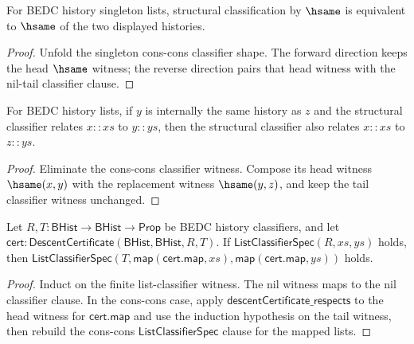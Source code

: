 \begin{theorem}
\label{thm:list-classifier-hsame-singleton-iff}
For BEDC history singleton lists, structural classification by \(\hsame\) is
equivalent to \(\hsame\) of the two displayed histories.
\end{theorem}
\begin{proof}
Unfold the singleton cons-cons classifier shape. The forward direction keeps
the head \(\hsame\) witness; the reverse direction pairs that head witness with
the nil-tail classifier clause.
\end{proof}

\begin{theorem}
\label{thm:list-classifier-hsame-cons-head-transport}
For BEDC history lists, if \(y\) is internally the same history as \(z\) and
the structural classifier relates \(x::xs\) to \(y::ys\), then the structural
classifier also relates \(x::xs\) to \(z::ys\).
\end{theorem}
\begin{proof}
Eliminate the cons-cons classifier witness. Compose its head witness
\(\hsame(x,y)\) with the replacement witness \(\hsame(y,z)\), and keep the
tail classifier witness unchanged.
\end{proof}

\begin{theorem}
\label{thm:list-classifier-certified-entry-descent}
Let $R,T:\mathsf{BHist}\to\mathsf{BHist}\to\mathsf{Prop}$ be BEDC history
classifiers, and let
$\mathsf{cert}:\mathsf{DescentCertificate}(\mathsf{BHist},\mathsf{BHist},R,T)$.
If
$\mathsf{ListClassifierSpec}(R,xs,ys)$ holds, then
$\mathsf{ListClassifierSpec}(T,\mathsf{map}(\mathsf{cert.map},xs),\mathsf{map}(\mathsf{cert.map},ys))$ holds.
\end{theorem}
\begin{proof}
Induct on the finite list-classifier witness. The nil witness maps to the nil
classifier clause. In the cons-cons case, apply
$\mathsf{descentCertificate\_respects}$ to the head witness for
$\mathsf{cert.map}$ and use the induction hypothesis on the tail witness, then
rebuild the cons-cons $\mathsf{ListClassifierSpec}$ clause for the mapped lists.
\end{proof}

